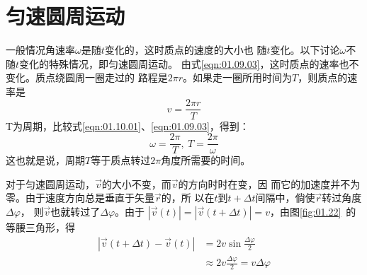 \section{匀速圆周运动}\label{sec:01.10}

    一般情况角速率$\omega$是随$t$变化的，这时质点的速度的大小也
随$t$变化。以下讨论$\omega$不随$t$变化的特殊情况，即匀速圆周运动。
由式\eqref{eqn:01.09.03}，这时质点的速率也不变化。质点绕圆周一圈走过的
路程是$2\pi r$。如果走一圈所用时间为$T$，则质点的速率是
\begin{equation}\label{eqn:01.10.01}
    v=\frac{2 \pi r}{T}
\end{equation}
T为周期，比较式\eqref{eqn:01.10.01}、\eqref{eqn:01.09.03}，得到：
\begin{equation}\label{eqn:01.10.02}
    \omega=\frac{2 \pi}{T}, ~ T=\frac{2 \pi}{\omega}
\end{equation}
这也就是说，周期$T$等于质点转过$2\pi$角度所需要的时间。

    对于匀速圆周运动，$\vec{v}$的大小不变，而$\vec{v}$的方向时时在变，因
而它的加速度并不为零。由于速度方向总是垂直于矢量$\vec{r}$的，所
以在$t$到$t+\Delta t$间隔中，倘使$\vec{r}$转过角度$\Delta\varphi$，
则$\vec{v}$也就转过了$\Delta\varphi$。由于
$|\vec{v}(t)|=|\vec{v}(t+\Delta t)|=v$，由图\ref{fig:01.22}~的等腰三角形，得
\begin{equation*}
    \begin{aligned}
        |\vec{v}(t+\Delta t)-\vec{v}(t)| &=2 v \sin \frac{\Delta \varphi}{2} \\
        & \approx 2 v\frac{\Delta \varphi}{2}=v \Delta \varphi
    \end{aligned}
\end{equation*}

